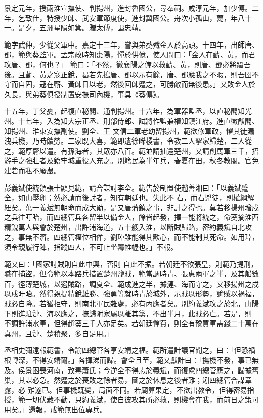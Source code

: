 \begin{pinyinscope}
 景定元年，授兩淮宣撫使、判揚州，進封魯國公，尋奉祠。咸淳元年，加少傅。二年，乞致仕，特授少師、武安軍節度使，進封冀國公。舟次小孤山，薨，年八十一。是夕，五洲星隕如箕。贈太傅，謚忠靖。



 範字武仲，少從父軍中。嘉定十三年，嘗與弟葵殲金人於高頭。十四年，出師唐、鄧，範與葵監軍。孟宗政時知棗陽，憚於供億，使人問曰：「金人在蘄、黃，而君攻唐、鄧，何也？」
 範曰：「不然，徹襄陽之備以救蘄、黃，則唐、鄧必將躡吾後。且蘄、黃之寇正銳，曷若先搗唐、鄧以示有餘，唐、鄧應我之不暇，則吾圉不守而自固，寇在蘄、黃師日以老，然後回師蹙之，可勝敵而無後患。」又敗金人於久長，與弟葵俱授制置安撫司內機，事具《葵傳》。



 十五年，丁父憂，起復直秘閣、通判揚州。十六年，為軍器監丞，以直秘閣知光州。十七年，入為知大宗正丞、刑部侍郎、試將作監兼權知鎮江府。進直徽猷閣、知揚州、淮東安撫副使。劉全、王
 文信二軍老幼留揚州，範欲修軍政，懼其徒漏洩兵機，乃時饋勞。二家既大喜，範即遺徐晞稷書，令教二人挈家歸楚，二人從之，範厚齎以遣。有孫海者，其眾亦八百。範並請抽還楚州，又請創馬軍三千，招游手之強壯者及籍牢城重役人充之。別籍民為半年兵，春夏在田，秋冬教閱。官免建砦而私不廢農。



 彭義斌使統領張士顯見範，請合謀討李全。範告於制置使趙善湘曰：「以義斌蹙全，如山壓卵；然必請而後討者，知有朝廷也。失此不
 右，而右兇徒，則權綱解紐矣。萬一義斌無朝命而成大勛，是又唐藩鎮之事，非計之得也。莫若移揚州增戍之兵往盱眙，而四總管兵各留半以備金人，餘皆起發，擇一能將統之，命葵摘淮西精銳萬人與會於楚州，出許浦海道，五十艘入淮，以斷賊歸路，密約義斌自北攻之，事無不濟。四總管權位相侔，劉琸雖能得其歡心，而不能制其死命。如用琸，須令親履行陣，指蹤四人，不可止坐籌帷幄也。」不報。



 範又曰：「國家討賊則自此中興，否則
 自此不振。若朝廷不欲張皇，則範乃提刑，職在捕盜，但令範以本路兵措置楚州鹽賊，範當調時青、張惠兩軍之半，及其船數百，徑薄楚城，以遏賊路，調夏全、範成進之半，據漣、海而守之，又移揚州之戍以戍盱眙。然得親提精銳雄勝、強勇等就時青於城外，示賊以形勢，諭賊以禍福，賊必自降。若猶拒守，則南北軍民雜處，必有內應者矣。別約義斌攻之於北，山陽下則進駐漣、海以應之，撫歸附家屬以離其黨，不出半月，此賊必亡。若是，則
 不調許浦水軍，但得趙葵三千人亦足矣。若朝廷憚費，則全有豫買軍需錢二十萬在真州，且漣、楚積聚，多自足用。」



 丞相史彌遠報範書，令諭四總管各享安靖之福。範所遣計議官聞之，曰：「但恐禍根轉深，不得安靖爾。」各揮涕而歸。會全且至，範又獻計曰：「撫機不發，事已無及。侯景困喪河南，致毒蕭氏；今逆全不得志於義斌，而復慮四總管應之，歸據舊巢，其謀必急。然蹙之於喪敗之餘者易，圖之於休息之後者難；矧四總管合謀章露，必
 難遂已。但事機既變，局面不同。若廟算果定，不欲出教令，但得密易指授，範一切伏藏不動，只約義斌，使自彼攻其所必救，則機會在我，而前日之策可用矣。」還報，戒範無出位專兵。




\end{pinyinscope}
